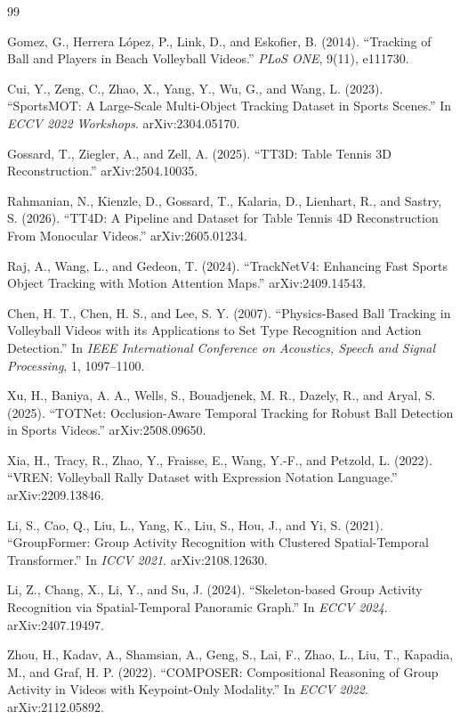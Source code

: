 \documentclass[a4paper]{article}
\begin{document}
\begin{thebibliography}{99}

 Gomez, G., Herrera López, P., Link, D., and Eskofier, B. (2014). ``Tracking of Ball and Players in Beach Volleyball Videos.'' \textit{PLoS ONE}, 9(11), e111730.

 Cui, Y., Zeng, C., Zhao, X., Yang, Y., Wu, G., and Wang, L. (2023). ``SportsMOT: A Large-Scale Multi-Object Tracking Dataset in Sports Scenes.'' In \textit{ECCV 2022 Workshops}. arXiv:2304.05170.

 Gossard, T., Ziegler, A., and Zell, A. (2025). ``TT3D: Table Tennis 3D Reconstruction.'' arXiv:2504.10035.

 Rahmanian, N., Kienzle, D., Gossard, T., Kalaria, D., Lienhart, R., and Sastry, S. (2026). ``TT4D: A Pipeline and Dataset for Table Tennis 4D Reconstruction From Monocular Videos.'' arXiv:2605.01234.

 Raj, A., Wang, L., and Gedeon, T. (2024). ``TrackNetV4: Enhancing Fast Sports Object Tracking with Motion Attention Maps.'' arXiv:2409.14543.

 Chen, H. T., Chen, H. S., and Lee, S. Y. (2007). ``Physics-Based Ball Tracking in Volleyball Videos with its Applications to Set Type Recognition and Action Detection.'' In \textit{IEEE International Conference on Acoustics, Speech and Signal Processing}, 1, 1097--1100.

 Xu, H., Baniya, A. A., Wells, S., Bouadjenek, M. R., Dazely, R., and Aryal, S. (2025). ``TOTNet: Occlusion-Aware Temporal Tracking for Robust Ball Detection in Sports Videos.'' arXiv:2508.09650.

 Xia, H., Tracy, R., Zhao, Y., Fraisse, E., Wang, Y.-F., and Petzold, L. (2022). ``VREN: Volleyball Rally Dataset with Expression Notation Language.'' arXiv:2209.13846.

 Li, S., Cao, Q., Liu, L., Yang, K., Liu, S., Hou, J., and Yi, S. (2021). ``GroupFormer: Group Activity Recognition with Clustered Spatial-Temporal Transformer.'' In \textit{ICCV 2021}. arXiv:2108.12630.

 Li, Z., Chang, X., Li, Y., and Su, J. (2024). ``Skeleton-based Group Activity Recognition via Spatial-Temporal Panoramic Graph.'' In \textit{ECCV 2024}. arXiv:2407.19497.

 Zhou, H., Kadav, A., Shamsian, A., Geng, S., Lai, F., Zhao, L., Liu, T., Kapadia, M., and Graf, H. P. (2022). ``COMPOSER: Compositional Reasoning of Group Activity in Videos with Keypoint-Only Modality.'' In \textit{ECCV 2022}. arXiv:2112.05892.


\end{thebibliography}
\end{document}
